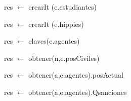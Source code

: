 \begin{algorithm}[H]
\begin{algorithmic}[1]
 
  \State res $\gets$ crearIt (e.estudiantes)
\EndFunction
\end{algorithmic}
\end{algorithm}


\begin{algorithm}[H]
\begin{algorithmic}[1]
 
  \State res $\gets$ crearIt (e.hippies)
\EndFunction
\end{algorithmic}
\end{algorithm}

\begin{algorithm}[H]
\begin{algorithmic}[1]
 
  \State res $\gets$ claves(e.agentes) 
\EndFunction
\end{algorithmic}
\end{algorithm}

\begin{algorithm}[H]
\begin{algorithmic}[1]
 
    \State res $\gets$ obtener(n,e.posCiviles)
\EndFunction
\end{algorithmic}
\end{algorithm}

\begin{algorithm}[H]
\begin{algorithmic}[1]
 
    \State res $\gets$ obtener(a,e.agentes).posActual
\EndFunction
\end{algorithmic}
\end{algorithm}

\begin{algorithm}[H]
\begin{algorithmic}[1]
 
    \State res $\gets$ obtener(a,e.agentes).Qsanciones
\EndFunction
\end{algorithmic}
\end{algorithm}

